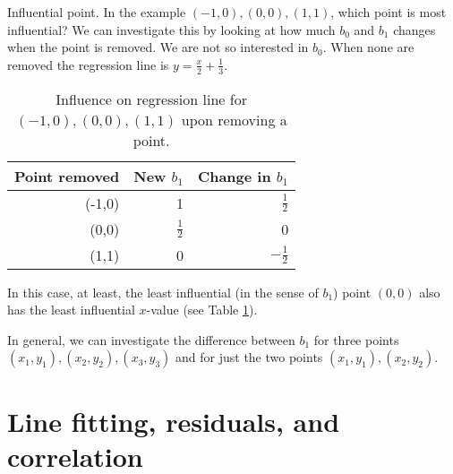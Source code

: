 


\begin{example}{Influential point.}
	In the example $(-1,0), (0,0), (1,1)$, which point is most influential?
	We can investigate this by looking at how much $b_0$ and $b_1$ changes when the point is removed.
	We are not so interested in $b_0$.
	When none are removed the regression line is $y=\frac{x}2+\frac13$.

	\begin{table}
	\centering
	\begin{tabular}{r | r | r}
	Point removed	& New $b_1$ 	& Change in $b_1$\\
	\hline
	(-1,0)		& 1			&  $\frac12$\\
	(0,0)			& $\frac12$	& 0\\
	(1,1)			& 0			& $-\frac12$\\
	\hline
	\end{tabular}
	\caption{Influence on regression line for $(-1,0), (0,0), (1,1)$ upon removing a point.}\label{influential}
	\end{table}
	In this case, at least, the least influential (in the sense of $b_1$) point $(0,0)$ also has the least influential $x$-value (see Table \ref{influential}).
\end{example}

In general, we can investigate the difference between $b_1$ for three points $(x_1,y_1),(x_2,y_2),(x_3,y_3)$ and for just the two points $(x_1,y_1),(x_2,y_2)$.


\section{Line fitting, residuals, and correlation}
\label{lineFittingResidualsCorrelation}




